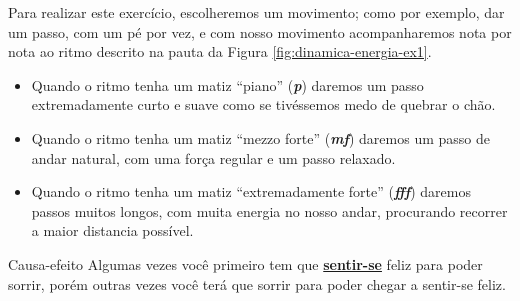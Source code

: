 \begin{example}
Para realizar este exercício, escolheremos um movimento; como por exemplo,
dar um passo, com um pé por vez, 
e com nosso movimento acompanharemos nota por nota 
ao ritmo descrito na pauta da Figura \ref{fig:dinamica-energia-ex1}.
\begin{itemize}
\item Quando o ritmo tenha um matiz ``piano'' (\textbf{\textit{p}}) 
daremos um passo extremadamente curto e suave como se tivéssemos medo de quebrar o chão.
\item Quando o ritmo tenha um matiz ``mezzo forte'' (\textbf{\textit{mf}}) 
daremos um passo de andar natural, com uma força regular e um passo relaxado. 
\item Quando o ritmo tenha um matiz ``extremadamente forte''  (\textbf{\textit{fff}}) 
daremos passos muitos longos, com muita energia no nosso andar, 
procurando recorrer a maior distancia possível.
\end{itemize}
\end{example}

\begin{FraseFernandoPR}{Causa-efeito}
Algumas vezes você primeiro tem que \hyperref[ref:emotionsentimental]{\textbf{sentir-se}} feliz para poder sorrir,
porém outras vezes você terá que sorrir para poder chegar a sentir-se feliz. %
\end{FraseFernandoPR}

